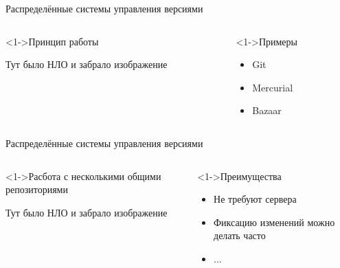 \documentclass[pdf,9pt,aspectratio=169]{beamer}
\begin{document}
\begin{frame}{Распределённые системы управления версиями}
  \begin{columns}[T]
    \begin{column}[]{0.45\textwidth}  
      \begin{exampleblock}<1->{Принцип работы}
        \begin{center}
           \Huge Тут было НЛО и забрало изображение
        \end{center}
      \end{exampleblock}
    \end{column}
    \begin{column}[]{0.45\textwidth}  
      \begin{block}<1->{Примеры}
        \begin{itemize}
          \item Git
          \item Mercurial
          \item Bazaar
        \end{itemize}
      \end{block}
    \end{column}
  \end{columns}
  \vfill
\end{frame}

\begin{frame}{Распределённые системы управления версиями}
  \begin{columns}[T]
    \begin{column}[]{0.45\textwidth}  
      \begin{exampleblock}<1->{Расбота с несколькими общими репозиториями}
        \begin{center}
           \Huge Тут было НЛО и забрало изображение
        \end{center}
      \end{exampleblock}
    \end{column}
    \begin{column}[]{0.45\textwidth}  
      \begin{block}<1->{Преимущества}
        \begin{itemize}
          \item Не требуют сервера
          \item Фиксацию изменений можно делать часто
          \item ...
        \end{itemize}
      \end{block}
    \end{column}
  \end{columns}
  \vfill
\end{frame}
\end{document}

